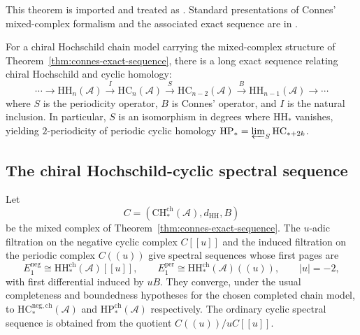 \begin{remark}
This theorem is imported and treated as \ClaimStatusProvedElsewhere. Standard
presentations of Connes' mixed-complex formalism and the associated exact
sequence are in \cite{Connes85,Loday98}.
\end{remark}

\begin{corollary}
\label{cor:connes-SBI}
For a chiral Hochschild chain model carrying the mixed-complex
structure of Theorem~\textup{\ref{thm:connes-exact-sequence}}, there
is a long exact sequence relating chiral Hochschild and cyclic homology:
\[\cdots \to \mathrm{HH}_n(\mathcal{A}) \xrightarrow{I} \mathrm{HC}_n(\mathcal{A}) \xrightarrow{S} \mathrm{HC}_{n-2}(\mathcal{A}) \xrightarrow{B} \mathrm{HH}_{n-1}(\mathcal{A}) \to \cdots\]
where $S$ is the periodicity operator, $B$ is Connes' operator, and $I$ is the natural inclusion. In particular, $S$ is an isomorphism in degrees where $\mathrm{HH}_*$ vanishes, yielding $2$-periodicity of periodic cyclic homology $\mathrm{HP}_* = \varprojlim_S \mathrm{HC}_{*+2k}$.
\end{corollary}

\subsection{The chiral Hochschild-cyclic spectral sequence}

\begin{theorem}
\label{thm:HC-spectral-sequence}
Let
\[
C=(\mathrm{CH}^{\mathrm{ch}}_*(\mathcal A),d_{\mathrm{HH}},B)
\]
be the mixed complex of Theorem~\textup{\ref{thm:connes-exact-sequence}}.
The $u$-adic filtration on the negative cyclic complex
$C[[u]]$ and the induced filtration on the periodic complex $C((u))$
give spectral sequences whose first pages are
\[
E_1^{\mathrm{neg}}\cong \mathrm{HH}^{\mathrm{ch}}_*(\mathcal A)[[u]],
\qquad
E_1^{\mathrm{per}}\cong \mathrm{HH}^{\mathrm{ch}}_*(\mathcal A)((u)),
\qquad |u|=-2,
\]
with first differential induced by $uB$. They converge, under the
usual completeness and boundedness hypotheses for the chosen completed
chain model, to $\mathrm{HC}^{\mathrm{neg,ch}}_*(\mathcal A)$ and
$\mathrm{HP}^{\mathrm{ch}}_*(\mathcal A)$ respectively. The ordinary
cyclic spectral sequence is obtained from the quotient
$C((u))/uC[[u]]$.
\end{theorem}

